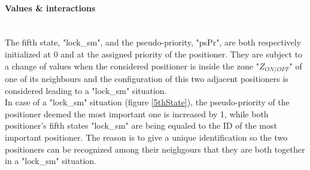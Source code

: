 \documentclass[]{spie}  %
\begin{document}
	\paragraph{Values \& interactions}\mbox{}\\
	The fifth state, "lock\_sm", and the pseudo-priority, "psPr", are both respectively initialized at 0 and at the assigned priority of the positioner. They are subject to a change of values when the considered positioner is inside the zone "$Z_{ON/OFF}$" of one of its neighbours and the configuration of this two adjacent positioners is considered leading to a "lock\_sm" situation. \\
	In case of a "lock\_sm" situation (figure \ref{5thState}), the pseudo-priority of the positioner deemed the most important one is increased by 1, while both positioner's fifth states "lock\_sm" are being equaled to the ID of the most important positioner. The reason is to give a unique identification so the two positioners can be recognized among their neighgours that they are both together in a "lock\_sm" situation.\\ 
	
\end{document}
